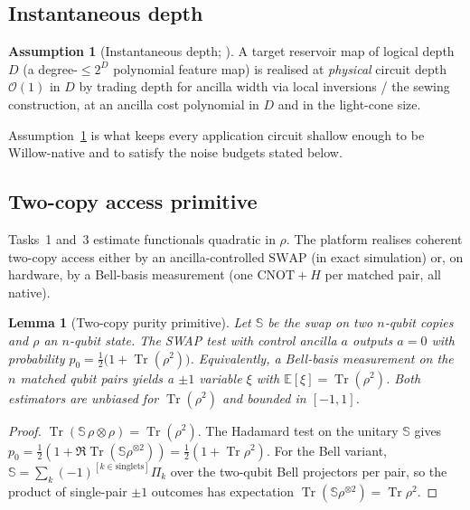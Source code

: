 \documentclass[11pt]{article}
\theoremstyle{plain}
\newtheorem{lemma}[theorem]{Lemma}
\theoremstyle{definition}
\newtheorem{assumption}[theorem]{Assumption}
\theoremstyle{remark}
\newcommand{\Tr}{\operatorname{Tr}}
\newcommand{\E}{\mathbb{E}}
\newcommand{\SWAP}{\mathbb{S}}
\newcommand{\bigO}{\mathcal{O}}
\begin{document}
\subsection{Instantaneous depth}
\begin{assumption}[Instantaneous depth; \cite{LSQC,GenAdv}]\label{ass:idepth}
A target reservoir map of logical depth $D$ (a degree-$\le 2^{D}$ polynomial feature map) is realised at \emph{physical} circuit depth $\bigO(1)$ in $D$ by trading depth for ancilla width via local inversions / the sewing construction, at an ancilla cost polynomial in $D$ and in the light-cone size.
\end{assumption}
Assumption~\ref{ass:idepth} is what keeps every application circuit shallow enough to be Willow-native and to satisfy the noise budgets stated below.

\subsection{Two-copy access primitive}
Tasks~1 and~3 estimate functionals quadratic in $\rho$. The platform realises coherent two-copy access either by an ancilla-controlled $\mathrm{SWAP}$ (in exact simulation) or, on hardware, by a Bell-basis measurement (one $\mathrm{CNOT}+H$ per matched pair, all native).

\begin{lemma}[Two-copy purity primitive]\label{lem:swap}
Let $\SWAP$ be the swap on two $n$-qubit copies and $\rho$ an $n$-qubit state. The SWAP test with control ancilla $a$ outputs $a=0$ with probability $p_0=\tfrac12\big(1+\Tr(\rho^2)\big)$. Equivalently, a Bell-basis measurement on the $n$ matched qubit pairs yields a $\pm1$ variable $\xi$ with $\E[\xi]=\Tr(\rho^2)$. Both estimators are unbiased for $\Tr(\rho^2)$ and bounded in $[-1,1]$.
\end{lemma}
\begin{proof}
$\Tr(\SWAP\,\rho\otimes\rho)=\Tr(\rho^2)$. The Hadamard test on the unitary $\SWAP$ gives $p_0=\tfrac12(1+\Re\Tr(\SWAP\rho^{\otimes2}))=\tfrac12(1+\Tr\rho^2)$. For the Bell variant, $\SWAP=\sum_{k}(-1)^{[k\in\text{singlets}]}\Pi_k$ over the two-qubit Bell projectors per pair, so the product of single-pair $\pm1$ outcomes has expectation $\Tr(\SWAP\rho^{\otimes2})=\Tr\rho^2$.\end{proof}
\end{document}
